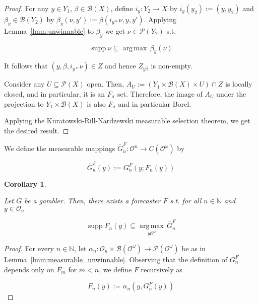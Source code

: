 \documentclass[11pt]{article}
\theoremstyle{definition}
\theoremstyle{plain}
\newtheorem{corollary}{Corollary}%
\newcommand{\Nats}{\mathbb{N}}
\newcommand{\Argmax}[1]{\underset{#1}{\operatorname{arg\,max}}\,}
\newcommand{\PM}{\mathcal{P}}
\DeclareMathOperator{\Sp}{supp}
\newcommand{\Ob}{\mathcal{O}}
\newcommand{\OO}{\Ob^\omega}
\newcommand{\PMO}{\PM(\OO)}
\newcommand{\Gm}{\mathcal{B}}
\newcommand{\GMO}{\Gm(\OO)}
\newcommand{\CO}{C(\OO)}
\begin{document}
\begin{proof}
For any ${y \in Y_1}$, ${\beta \in \Gm\left(X\right)}$, define ${i_y: Y_2 \rightarrow X}$ by ${i_y\left(y_2\right):=\left(y,y_2\right)}$ and ${\beta_y \in \Gm\left(Y_{2}\right)}$ by $\beta_y\left(\nu,y'\right):=\beta\left(i_{y*}\nu,y,y'\right)$. Applying Lemma~\ref{lmm:unwinnable} to ${\beta_y}$ we get ${\nu \in \PM\left(Y_2\right)}$ s.t.

$$\Sp \nu \subseteq \Argmax{} \beta_y\left(\nu\right)$$

It follows that ${\left(y,\beta,i_{y*}\nu\right) \in Z}$ and hence ${Z_{y\beta}}$ is non-empty.

Consider any ${U \subseteq \PM\left(X\right)}$ open. Then, ${A_U:=\left(Y_{1} \times \Gm\left(X\right) \times U\right) \cap Z}$ is locally closed, and in particular, it is an ${F_\sigma}$ set. Therefore, the image of ${A_U}$ under the projection to ${Y_{1} \times \Gm\left(X\right)}$ is also ${F_\sigma}$ and in particular Borel. 

Applying the Kuratowski-Rill-Nardzewski measurable selection theorem, we get the desired result.
\end{proof}

We define the measurable mappings $\bar{G}^F_n: \Ob^n \rightarrow \CO$ by

\begin{equation}
\bar{G}^F_n\left(y\right) := G^F_n\left(y;F_n\left(y\right)\right)
\end{equation}

\begin{corollary}
\label{crl:dominate_one}

Let $G$ be a gambler. Then, there exists a forecaster $F$ s.t. for all $n \in \Nats$ and $y \in \Ob_n$

\begin{equation}
\Sp F_n\left(y\right) \subseteq \Argmax{y\OO} \bar{G}^F_n
\end{equation}

\end{corollary}

\begin{proof}

For every $n \in \Nats$, let $\alpha_n: \Ob_n \times \GMO \rightarrow \PMO$ be as in Lemma~\ref{lmm:measurable_unwinnable}. Observing that the definition of $G^F_n$ depends only on $F_m$ for $m < n$, we define $F$ recursively as

\[F_n\left(y\right):=\alpha_n\left(y,G^F_n\left(y\right)\right)\]
\end{proof}
\end{document}
